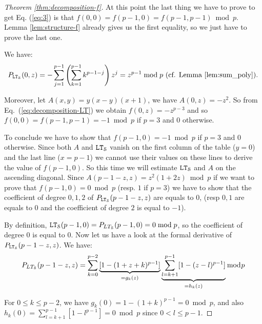 \begin{proof}[Theorem \ref{thm:decomposition-f}]
    At this point the last thing we have to prove to get Eq. (\ref{eq:3}) is that $f(0,0) = f(p-1,0) = f(p-1,p-1) \bmod p$. Lemma \ref{lem:structure-f} already gives us the first equality, so we just have to prove the last one.

    We have:
    $$ P_{\LT_\S}(0,z)  = -\sum_{j=1}^{p-1}\left(\sum_{k=1}^{p-1}k^{p-1-j}\right)z^j  = z^{p-1} \bmod p \text{ (cf. Lemma \ref{lem:sum_poly}).} $$

    Moreover, let $A(x,y) = y(x-y)(x+1)$, we have $A(0,z) = -z^2$. So from Eq.~(\ref{eq:decomposition-LT}) we obtain $f(0,z) = -z^{p-3}$ and so $f(0,0) = f(p-1,p-1) = -1 \bmod p$ if $p = 3$ and $0$ otherwise.

    To conclude we have to show that $f(p-1,0) = -1 \bmod p$ if $p=3$ and $0$ otherwise. 
    Since both $A$ and $\LT_\S$ vanish on the first column of the table ($y=0$) and the last line ($x=p-1$) we cannot use their values on these lines to derive the value of $f(p-1,0)$. So this time we will estimate $\LT_\S$ and $A$ on the ascending diagonal. Since $A(p-1-z,z) = z^2(1+2z) \bmod p$ if we want to prove that $f(p-1,0) = 0 \bmod p$ (resp. $1$ if $p=3$) we have to show that the coefficient of degree $0,1,2$ of $P_{\LT_\S}(p-1-z,z)$ are equals to $0$, (resp $0, 1$ are equals to $0$ and the coefficient of degree $2$ is equal to $-1$).

    By definition, $\LT_\S(p-1,0) = P_{LT_\S}(p-1,0) = 0 \bmod p$, so the coefficient of degree $0$ is equal to $0$. Now let us have a look at the formal derivative of $P_{\LT_\S}(p-1-z,z)$. We have: 
    $$ P_{LT_\S}(p-1-z,z) = \sum_{k=0}^{p-2}\underbrace{[1-(1+z+k)^{p-1}]}_{=g_k(z)}\underbrace{\sum_{l=k+1}^{p-1}[1-(z-l)^{p-1}]}_{=h_k(z)} \bmod p $$
 
  For $0\leq k \leq p-2$, we have $g_k(0) = 1-(1+k)^{p-1} = 0 \bmod p$, and also $h_k(0) = \sum_{l=k+1}^{p-1}[1-l^{p-1}] = 0 \bmod p$ since $0<l\leq p-1$. 


\end{proof}
